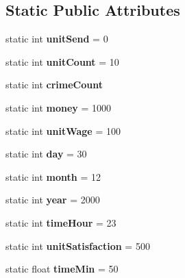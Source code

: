 \subsection*{Static Public Attributes}
\begin{DoxyCompactItemize}
\item 
\hypertarget{classrandom_instance_a0e86ebd9e4ae8c213298a67742ba29ef}{}static int {\bfseries unit\+Send} = 0\label{classrandom_instance_a0e86ebd9e4ae8c213298a67742ba29ef}

\item 
\hypertarget{classrandom_instance_a44cf85cfa5c859825c4c2a8a466a2dda}{}static int {\bfseries unit\+Count} = 10\label{classrandom_instance_a44cf85cfa5c859825c4c2a8a466a2dda}

\item 
\hypertarget{classrandom_instance_acfb2f0ab3a2186cc8e00fb49764a062e}{}static int {\bfseries crime\+Count}\label{classrandom_instance_acfb2f0ab3a2186cc8e00fb49764a062e}

\item 
\hypertarget{classrandom_instance_a8c5866e85f8e8ebac681a2b30c28778d}{}static int {\bfseries money} = 1000\label{classrandom_instance_a8c5866e85f8e8ebac681a2b30c28778d}

\item 
\hypertarget{classrandom_instance_a629e99da5bdf553a859a127a62cbe3d9}{}static int {\bfseries unit\+Wage} = 100\label{classrandom_instance_a629e99da5bdf553a859a127a62cbe3d9}

\item 
\hypertarget{classrandom_instance_ad0bd7b1f32448fead10ff7dab284fadb}{}static int {\bfseries day} = 30\label{classrandom_instance_ad0bd7b1f32448fead10ff7dab284fadb}

\item 
\hypertarget{classrandom_instance_a5d7d3e6d79479d6f06c6a8eb52d8d078}{}static int {\bfseries month} = 12\label{classrandom_instance_a5d7d3e6d79479d6f06c6a8eb52d8d078}

\item 
\hypertarget{classrandom_instance_aa2c4ad17b10e4be3eddaeb02d43db34f}{}static int {\bfseries year} = 2000\label{classrandom_instance_aa2c4ad17b10e4be3eddaeb02d43db34f}

\item 
\hypertarget{classrandom_instance_af83397aaf6ed43e884247bb4d490bbc9}{}static int {\bfseries time\+Hour} = 23\label{classrandom_instance_af83397aaf6ed43e884247bb4d490bbc9}

\item 
\hypertarget{classrandom_instance_ab0fd3847ec9c0982e51074153d8b9722}{}static int {\bfseries unit\+Satisfaction} = 500\label{classrandom_instance_ab0fd3847ec9c0982e51074153d8b9722}

\item 
\hypertarget{classrandom_instance_a36cdfc1a24517e8fc3839358da61f01f}{}static float {\bfseries time\+Min} = 50\label{classrandom_instance_a36cdfc1a24517e8fc3839358da61f01f}

\end{DoxyCompactItemize}



